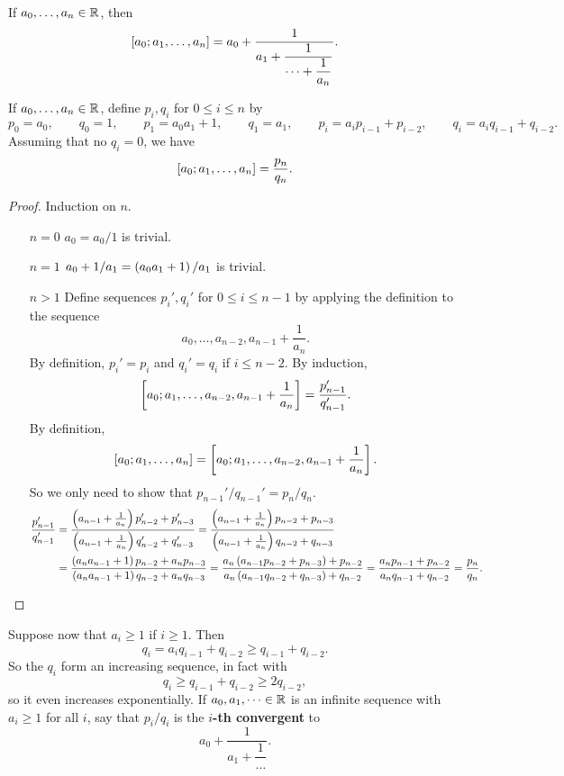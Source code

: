 If $ a_0, \dots, a_n \in \mathbb{R} $, then
$$ \sbr{a_0; a_1, \dots, a_n} = a_0 + \dfrac{1}{a_1 + \dfrac{1}{\dots + \dfrac{1}{a_n}}}. $$

\pagebreak

\begin{lemma}
\label{lem:68}
If $ a_0, \dots, a_n \in \mathbb{R} $, define $ p_i, q_i $ for $ 0 \le i \le n $ by
$$ p_0 = a_0, \qquad q_0 = 1, \qquad p_1 = a_0a_1 + 1, \qquad q_1 = a_1, \qquad p_i = a_ip_{i - 1} + p_{i - 2}, \qquad q_i = a_iq_{i - 1} + q_{i - 2}. $$
Assuming that no $ q_i = 0 $, we have
$$ \sbr{a_0; a_1, \dots, a_n} = \dfrac{p_n}{q_n}. $$
\end{lemma}

\begin{proof}
Induction on $ n $.
\begin{itemize}[leftmargin=0.5in]
\item[$ n = 0 $] $ a_0 = a_0 / 1 $ is trivial.
\item[$ n = 1 $] $ a_0 + 1 / a_1 = \br{a_0a_1 + 1} / a_1 $ is trivial.
\item[$ n > 1 $] Define sequences $ p_i', q_i' $ for $ 0 \le i \le n - 1 $ by applying the definition to the sequence
$$ a_0, \dots, a_{n - 2}, a_{n - 1} + \dfrac{1}{a_n}. $$
By definition, $ p_i' = p_i $ and $ q_i' = q_i $ if $ i \le n - 2 $. By induction,
$$ \sbr{a_0; a_1, \dots, a_{n - 2}, a_{n - 1} + \dfrac{1}{a_n}} = \dfrac{p_{n - 1}'}{q_{n - 1}'}. $$
By definition,
$$ \sbr{a_0; a_1, \dots, a_n} = \sbr{a_0; a_1, \dots, a_{n - 2}, a_{n - 1} + \dfrac{1}{a_n}}. $$
So we only need to show that $ p_{n - 1}' / q_{n - 1}' = p_n / q_n $.
\begin{align*}
\dfrac{p_{n - 1}'}{q_{n - 1}'}
& = \dfrac{\br{a_{n - 1} + \tfrac{1}{a_n}}p_{n - 2}' + p_{n - 3}'}{\br{a_{n - 1} + \tfrac{1}{a_n}}q_{n - 2}' + q_{n - 3}'}
= \dfrac{\br{a_{n - 1} + \tfrac{1}{a_n}}p_{n - 2} + p_{n - 3}}{\br{a_{n - 1} + \tfrac{1}{a_n}}q_{n - 2} + q_{n - 3}} \\
& = \dfrac{\br{a_na_{n - 1} + 1}p_{n - 2} + a_np_{n - 3}}{\br{a_na_{n - 1} + 1}q_{n - 2} + a_nq_{n - 3}}
= \dfrac{a_n\br{a_{n - 1}p_{n - 2} + p_{n - 3}} + p_{n - 2}}{a_n\br{a_{n - 1}q_{n - 2} + q_{n - 3}} + q_{n - 2}}
= \dfrac{a_np_{n - 1} + p_{n - 2}}{a_nq_{n - 1} + q_{n - 2}}
= \dfrac{p_n}{q_n}.
\end{align*}
\end{itemize}
\end{proof}

Suppose now that $ a_i \ge 1 $ if $ i \ge 1 $. Then
$$ q_i = a_iq_{i - 1} + q_{i - 2} \ge q_{i - 1} + q_{i - 2}. $$
So the $ q_i $ form an increasing sequence, in fact with
$$ q_i \ge q_{i - 1} + q_{i - 2} \ge 2q_{i - 2}, $$
so it even increases exponentially. If $ a_0, a_1, \dots \in \mathbb{R} $ is an infinite sequence with $ a_i \ge 1 $ for all $ i $, say that $ p_i / q_i $ is the \textbf{$ i $-th convergent} to
$$ a_0 + \dfrac{1}{a_1 + \dfrac{1}{\dots}}. $$

